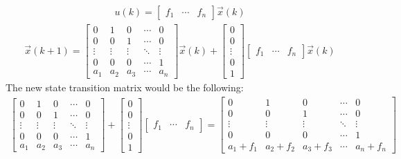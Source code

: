 \begin{align*}
    u(k) = \begin{bmatrix}
        f_1 & \cdots & f_n
        \end{bmatrix} \vec{x}(k)
\end{align*}
\begin{align*}
    \vec{x}(k + 1) = \begin{bmatrix}
        0 & 1 & 0 & \cdots & 0 \\
        0 & 0 & 1 & \cdots & 0 \\
        \vdots & \vdots & \vdots & \ddots & \vdots \\
        0 & 0 & 0 & \cdots & 1 \\
        a_1 & a_2 & a_3 & \cdots & a_n
    \end{bmatrix} \vec{x}(k) + \begin{bmatrix}
        0 \\ 0 \\ \vdots \\ 0 \\ 1
    \end{bmatrix} \begin{bmatrix}
        f_1 & \cdots & f_n
        \end{bmatrix} \vec{x}(k)
\end{align*}
The new state transition matrix would be the following:
\begin{align*}
    \begin{bmatrix}
        0 & 1 & 0 & \cdots & 0 \\
        0 & 0 & 1 & \cdots & 0 \\
        \vdots & \vdots & \vdots & \ddots & \vdots \\
        0 & 0 & 0 & \cdots & 1 \\
        a_1 & a_2 & a_3 & \cdots & a_n
    \end{bmatrix} + \begin{bmatrix}
        0 \\ 0 \\ \vdots \\ 0 \\ 1
    \end{bmatrix} \begin{bmatrix}
        f_1 & \cdots & f_n
        \end{bmatrix} = \begin{bmatrix}
        0 & 1 & 0 & \cdots & 0 \\
        0 & 0 & 1 & \cdots & 0 \\
        \vdots & \vdots & \vdots & \ddots & \vdots \\
        0 & 0 & 0 & \cdots & 1 \\
        a_1 + f_1 & a_2 + f_2 & a_3 + f_3 & \cdots & a_n + f_n
    \end{bmatrix}
\end{align*}
